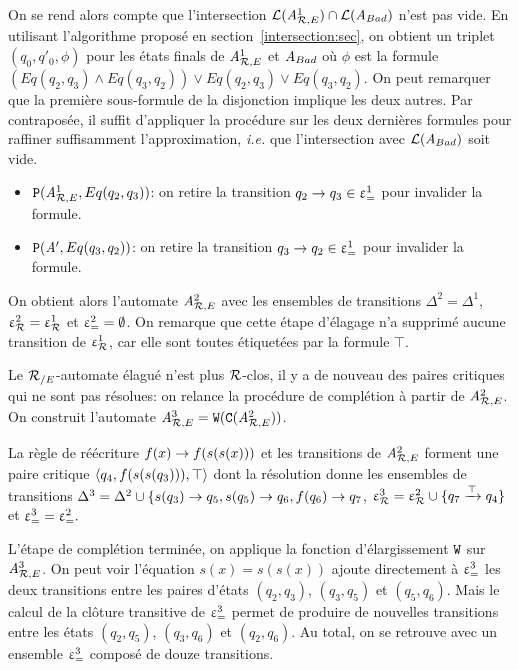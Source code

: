 On se rend alors compte que l'intersection $\mathcal{L}({\mathit A}_{\mathcal R,E}^1) \cap \mathcal{L}(\mathit A_{Bad})$
n'est pas vide. En utilisant l'algorithme proposé en section~\ref{intersection:sec},
on obtient un triplet $(q_0,q'_0,\phi)$ pour les états finals
de ${\mathit A}_{\mathcal R,E}^1$ et $\mathit A_{Bad}$ où $\phi$ est la formule 
$(Eq(q_2,q_3) \land Eq(q_3,q_2)) \lor Eq(q_2,q_3) \lor Eq(q_3,q_2)$.
On peut remarquer que la première sous-formule de la disjonction implique les deux autres.
Par contraposée, il suffit d'appliquer la procédure sur les deux dernières formules
pour raffiner suffisamment l'approximation, \textit{i.e.} que l'intersection
avec $\mathcal{L}(\mathit A_{Bad})$ soit vide.
\begin{itemize}
  \item $\mathtt{P}({\mathit A}_{\mathcal R,E}^1, Eq(q_2,q_3))$: on retire la transition 
    $q_2 \rightarrow q_3 \in \upvarepsilon_{=}^1$ pour invalider la formule.
  \item $\mathtt{P}(\mathit A', Eq(q_3,q_2))$: on retire la transition 
        $q_3 \rightarrow q_2 \in \upvarepsilon_{=}^1$ pour invalider la formule.
\end{itemize}
On obtient alors l'automate ${\mathit A}_{\mathcal R,E}^2$ avec les ensembles de transitions
$\Delta^2=\Delta^1$, $\upvarepsilon_{\mathcal R}^2= \upvarepsilon_{\mathcal R}^1$ et $\upvarepsilon_{=}^2=\emptyset$.
On remarque que cette étape d'élagage n'a supprimé aucune
transition de $\upvarepsilon_{\mathcal R}^1$, car elle sont toutes étiquetées
par la formule $\top$.

Le ${\mathcal R_{/E}}$-automate élagué n'est plus $\mathcal R$-clos, il y a de nouveau
des paires critiques qui ne sont pas résolues: on relance la procédure
de complétion à partir de ${\mathit A}_{\mathcal R,E}^2$.
On construit l'automate ${\mathit A}_{\mathcal R,E}^3=\mathtt{W}(\mathtt{C}({\mathit A}_{\mathcal R,E}^2))$.

La règle de réécriture $f(x) \rightarrow f(s(s(x)))$ et les transitions de ${\mathit A}_{\mathcal R,E}^2$ 
forment une paire critique $\langle q_4, f(s(s(q_3))), \top \rangle$ dont la résolution donne
les ensembles de transitions  $\Delta^3 = \Delta^2 \cup
\{s(q_3)\rightarrow q_5, s(q_5)\rightarrow q_6, f(q_6) \rightarrow q_7$, $\upvarepsilon_{\mathcal R}^3 = \upvarepsilon_{\mathcal R}^2 \cup
\{q_7\xrightarrow{\top}q_4\}$ et $\upvarepsilon_{=}^3 = \upvarepsilon_{=}^2.$

L'étape de complétion terminée, on applique la fonction d'élargissement
$\mathtt{W}$ sur ${\mathit A}_{\mathcal R,E}^3$. 
On peut voir l'équation $s(x) = s(s(x))$ ajoute  directement à $\upvarepsilon_{=}^3$
les deux transitions entre les paires d'états $(q_2,q_3)$, $(q_3,q_5)$ et
$(q_5,q_6)$. Mais le calcul de la clôture transitive de $\upvarepsilon_{=}^3$ permet de produire
de nouvelles transitions entre les états $(q_2,q_5)$, $(q_3,q_6)$ et $(q_2,q_6)$.
Au total, on se retrouve avec un ensemble $\upvarepsilon_{=}^3$ composé de douze transitions.


